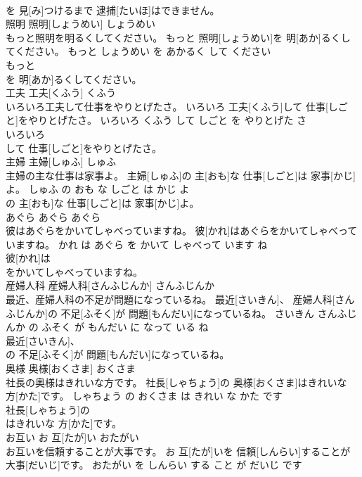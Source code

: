 \documentclass[8pt]{extreport}
\begin{document}
\begin{CJK}{UTF8}{min}
\\	を 見[み]つけるまで 逮捕[たいほ]はできません。			
\\	照明	照明[しょうめい]	しょうめい	
\\	もっと照明を明るくしてください。	もっと 照明[しょうめい]を 明[あか]るくしてください。	もっと しょうめい を あかるく して ください	
\\	もっと
\\	を 明[あか]るくしてください。			
\\	工夫	工夫[くふう]	くふう	
\\	いろいろ工夫して仕事をやりとげたさ。	いろいろ 工夫[くふう]して 仕事[しごと]をやりとげたさ。	いろいろ くふう して しごと を やりとげた さ	
\\	いろいろ
\\	して 仕事[しごと]をやりとげたさ。			
\\	主婦	主婦[しゅふ]	しゅふ	
\\	主婦の主な仕事は家事よ。	主婦[しゅふ]の 主[おも]な 仕事[しごと]は 家事[かじ]よ。	しゅふ の おも な しごと は かじ よ	
\\	の 主[おも]な 仕事[しごと]は 家事[かじ]よ。			
\\	あぐら	あぐら	あぐら	
\\	彼はあぐらをかいてしゃべっていますね。	彼[かれ]はあぐらをかいてしゃべっていますね。	かれ は あぐら を かいて しゃべって います ね	
\\	彼[かれ]は
\\	をかいてしゃべっていますね。			
\\	産婦人科	産婦人科[さんふじんか]	さんふじんか	
\\	最近、産婦人科の不足が問題になっているね。	最近[さいきん]、 産婦人科[さんふじんか]の 不足[ふそく]が 問題[もんだい]になっているね。	さいきん さんふじんか の ふそく が もんだい に なって いる ね	
\\	最近[さいきん]、
\\	の 不足[ふそく]が 問題[もんだい]になっているね。			
\\	奥様	奥様[おくさま]	おくさま	
\\	社長の奥様はきれいな方です。	社長[しゃちょう]の 奥様[おくさま]はきれいな 方[かた]です。	しゃちょう の おくさま は きれい な かた です	
\\	社長[しゃちょう]の
\\	はきれいな 方[かた]です。			
\\	お互い	お 互[たが]い	おたがい	
\\	お互いを信頼することが大事です。	お 互[たが]いを 信頼[しんらい]することが 大事[だいじ]です。	おたがい を しんらい する こと が だいじ です	

\end{CJK}
\end{document}
